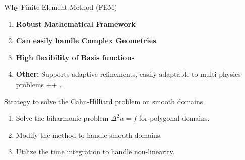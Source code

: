 \begin{frame}
    \begin{block}{Why Finite Element Method (FEM)}
        \begin{enumerate}
            \item \textbf{Robust Mathematical Framework}
            \item \textbf{Can easily handle Complex Geometries}
            \item \textbf{High flexibility of Basis functions}
            \item \textbf{Other: } Supports adaptive refinements, easily adaptable to multi-physics problems ++ .
        \end{enumerate}
    \end{block}
\end{frame}

\begin{frame}
    \begin{block}{Strategy to solve the Cahn-Hilliard problem on smooth domains}
        \begin{enumerate}
            \item Solve the biharmonic problem $\Delta ^2 u = f$ for polygonal domains.
            \item Modify the method to handle smooth domains.
            \item Utilize the time integration to handle non-linearity.
        \end{enumerate}
    \end{block}
\end{frame}



